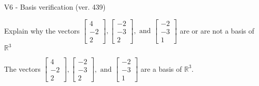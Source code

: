 \begin{exercise}
  \begin{exerciseTitle}V6 - Basis verification (ver. 439)\end{exerciseTitle}
  \begin{exerciseStatement}
    Explain why the vectors \(\left[\begin{array}{r}
4 \\
-2 \\
2
\end{array}\right] , \left[\begin{array}{r}
-2 \\
-3 \\
2
\end{array}\right] , \text{ and } \left[\begin{array}{r}
-2 \\
-3 \\
1
\end{array}\right]\) are or are not a basis of \(\mathbb{R}^3\)	


  \end{exerciseStatement}
  \begin{exerciseAnswer}
   The vectors \(\left[\begin{array}{r}
4 \\
-2 \\
2
\end{array}\right] , \left[\begin{array}{r}
-2 \\
-3 \\
2
\end{array}\right] , \text{ and } \left[\begin{array}{r}
-2 \\
-3 \\
1
\end{array}\right]\) 
  	 are  a basis of \(\mathbb{R}^3\).
  


  \end{exerciseAnswer}
\end{exercise}